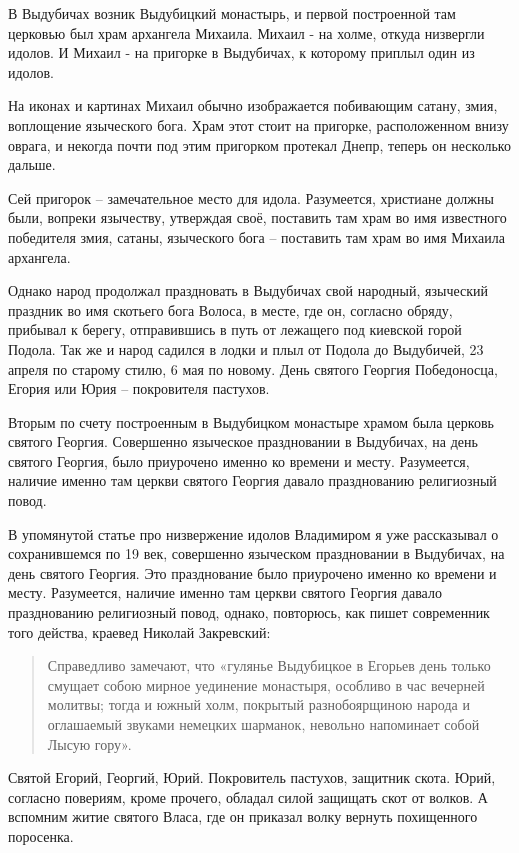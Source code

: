 \documentclass[a5paper,11pt,openany]{article}
\begin{document}
   В Выдубичах возник Выдубицкий монастырь, и первой построенной там церковью был храм архангела Михаила. Михаил - на холме, откуда низвергли идолов. И Михаил - на пригорке в Выдубичах, к которому приплыл один из идолов.
 
   На иконах и картинах Михаил обычно изображается побивающим сатану, змия, воплощение языческого бога. Храм этот стоит на пригорке, расположенном внизу оврага, и некогда почти под этим пригорком протекал Днепр, теперь он несколько дальше.

  Сей пригорок – замечательное место для идола. Разумеется, христиане должны были, вопреки язычеству, утверждая своё, поставить там храм во имя известного победителя змия, сатаны, языческого бога – поставить там храм во имя Михаила архангела.

    Однако народ продолжал праздновать в Выдубичах свой народный, языческий праздник  во имя скотьего бога Волоса, в месте, где он, согласно обряду, прибывал к берегу, отправившись в путь от лежащего под киевской горой Подола. Так же и народ садился в лодки и плыл от Подола до Выдубичей, 23 апреля по старому стилю, 6 мая по новому. День святого Георгия Победоносца, Егория или Юрия – покровителя пастухов. 

   Вторым по счету построенным в Выдубицком монастыре храмом была церковь святого Георгия. Совершенно языческое праздновании в Выдубичах, на день святого Георгия, было приурочено именно ко времени и месту. Разумеется, наличие именно там церкви святого Георгия давало празднованию религиозный повод.

В упомянутой статье про низвержение идолов Владимиром я уже рассказывал о сохранившемся по 19 век, совершенно языческом праздновании в Выдубичах, на день святого Георгия. Это празднование было приурочено именно ко времени и месту. Разумеется, наличие именно там церкви святого Георгия давало празднованию религиозный повод, однако, повторюсь, как пишет современник того действа, краевед Николай Закревский:

\begin{quotation}
\noindent Справедливо замечают, что «гулянье Выдубицкое в Егорьев день только смущает собою мирное уединение монастыря, особливо в час вечерней молитвы; тогда и южный холм, покрытый разнобоярщиною народа и оглашаемый звуками немецких шарманок, невольно напоминает собой Лысую гору».\end{quotation}

  Святой Егорий, Георгий, Юрий.  Покровитель пастухов, защитник скота. Юрий, согласно повериям, кроме прочего, обладал силой защищать скот от волков. А вспомним житие святого Власа, где он приказал волку вернуть похищенного поросенка.
\end{document}
